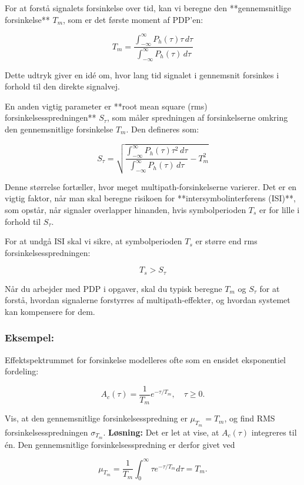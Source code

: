 \documentclass[a4paper,12pt]{book}
\begin{document}
	For at forstå signalets forsinkelse over tid, kan vi beregne den **gennemsnitlige forsinkelse** \( T_m \), som er det første moment af PDP'en:
	
	\[
	T_m = \frac{\int_{-\infty}^{\infty} P_h(\tau) \tau \, d\tau}{\int_{-\infty}^{\infty} P_h(\tau) \, d\tau}
	\]
	
	Dette udtryk giver en idé om, hvor lang tid signalet i gennemsnit forsinkes i forhold til den direkte signalvej.
	
	En anden vigtig parameter er **root mean square (rms) forsinkelsesspredningen** \( S_{\tau} \), som måler spredningen af forsinkelserne omkring den gennemsnitlige forsinkelse \( T_m \). Den defineres som:
	
	\[
	S_{\tau} = \sqrt{\frac{\int_{-\infty}^{\infty} P_h(\tau) \tau^2 \, d\tau}{\int_{-\infty}^{\infty} P_h(\tau) \, d\tau} - T_m^2}
	\]
	
	Denne størrelse fortæller, hvor meget multipath-forsinkelserne varierer. Det er en vigtig faktor, når man skal beregne risikoen for **intersymbolinterferens (ISI)**, som opstår, når signaler overlapper hinanden, hvis symbolperioden \( T_s \) er for lille i forhold til \( S_{\tau} \).
	
	For at undgå ISI skal vi sikre, at symbolperioden \( T_s \) er større end rms forsinkelsesspredningen:
	
	\[
	T_s > S_{\tau}
	\]
	
	Når du arbejder med PDP i opgaver, skal du typisk beregne \( T_m \) og \( S_{\tau} \) for at forstå, hvordan signalerne forstyrres af multipath-effekter, og hvordan systemet kan kompensere for dem.
	
	\subsubsection{Eksempel:}
	Effektspektrummet for forsinkelse modelleres ofte som en ensidet eksponentiel fordeling:
	
	\[
	A_c(\tau) = \frac{1}{T_m} e^{-\tau/T_m}, \quad \tau \geq 0.
	\]
	
	Vis, at den gennemsnitlige forsinkelsesspredning er \( \mu_{T_m} = T_m \), og find RMS forsinkelsesspredningen \( \sigma_{T_m} \).
	\newline\newline
	\textbf{Løsning:} Det er let at vise, at \( A_c(\tau) \) integreres til én. Den gennemsnitlige forsinkelsesspredning er derfor givet ved
	
	\[
	\mu_{T_m} = \frac{1}{T_m} \int_0^\infty \tau e^{-\tau/T_m} d\tau = T_m.
	\]
	
\end{document}
